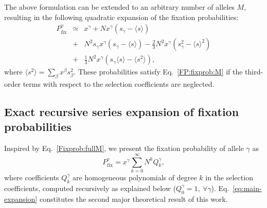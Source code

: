 \documentclass[9pt,twocolumn,twoside]{gsajnl}
\newcommand{\fix}{\mathrm{fix}}
\begin{document}
The above formulation can be extended to an arbitrary number of alleles $M$, resulting in the following quadratic expansion of the fixation probabilities:
\begin{eqnarray} \label{Fixprob:fullM}
P_{\text{fix}}^{\gamma} &\simeq& x^\gamma + N x^\gamma (s_\gamma - \langle s \rangle) \\
&+& N ^2 s_\gamma x^\gamma (s_\gamma - \langle s \rangle) - \frac{2}{3} N^2 x^\gamma (s_\gamma^2 - \langle s \rangle^2) \nonumber \\
&+& \frac{1}{3} N^2 x^\gamma (s_\gamma \langle s \rangle - \langle s^2 \rangle), \nonumber
\end{eqnarray}
where $\langle s^2 \rangle = \sum_{\beta} x^\beta s_\beta^2$. These probabilities satisfy Eq.~\eqref{FP:fixprob:M} if the third-order terms with respect to the selection coefficients are neglected.


\subsection{Exact recursive series expansion of fixation probabilities}
Inspired by Eq.~\eqref{Fixprob:fullM}, we present the fixation probability of allele $\gamma$ as
\begin{equation}
P^\gamma_{\fix}
=
x^\gamma \sum_{k=0}^{\infty} N^k Q_k^\gamma,
\label{eq:main-expansion}
\end{equation}
where coefficients $Q_k^\gamma$ are homogeneous polynomials of degree $k$ in the selection coefficients, computed recursively as explained below ($Q_0^\gamma = 1,~\forall \gamma$).
Eq.~\eqref{eq:main-expansion} constitutes the second major theoretical result of this work.


\end{document}
